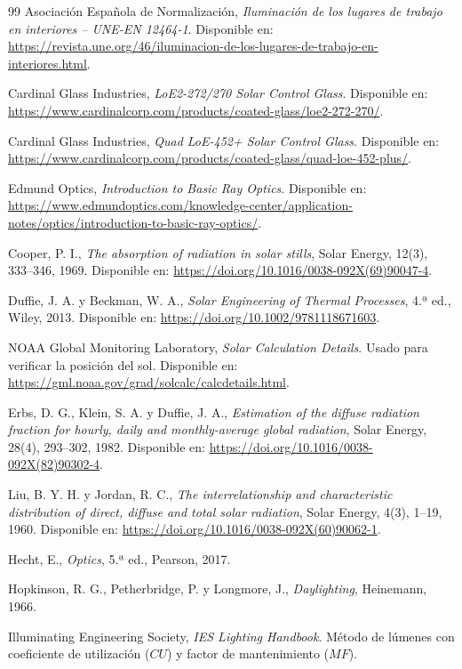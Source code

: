 \documentclass[12pt,a4paper]{article}
\begin{document}
\begin{thebibliography}{99}
Asociación Española de Normalización, \textit{Iluminación de los lugares de trabajo en interiores -- UNE-EN 12464-1}. Disponible en: \url{https://revista.une.org/46/iluminacion-de-los-lugares-de-trabajo-en-interiores.html}.

Cardinal Glass Industries, \textit{LoE2-272/270 Solar Control Glass}. Disponible en: \url{https://www.cardinalcorp.com/products/coated-glass/loe2-272-270/}.

Cardinal Glass Industries, \textit{Quad LoE-452+ Solar Control Glass}. Disponible en: \url{https://www.cardinalcorp.com/products/coated-glass/quad-loe-452-plus/}.

Edmund Optics, \textit{Introduction to Basic Ray Optics}. Disponible en: \url{https://www.edmundoptics.com/knowledge-center/application-notes/optics/introduction-to-basic-ray-optics/}.

Cooper, P. I., \textit{The absorption of radiation in solar stills}, Solar Energy, 12(3), 333--346, 1969. Disponible en: \url{https://doi.org/10.1016/0038-092X(69)90047-4}.

Duffie, J. A. y Beckman, W. A., \textit{Solar Engineering of Thermal Processes}, 4.ª ed., Wiley, 2013. Disponible en: \url{https://doi.org/10.1002/9781118671603}.

NOAA Global Monitoring Laboratory, \textit{Solar Calculation Details}. Usado para verificar la posición del sol. Disponible en: \url{https://gml.noaa.gov/grad/solcalc/calcdetails.html}.

Erbs, D. G., Klein, S. A. y Duffie, J. A., \textit{Estimation of the diffuse radiation fraction for hourly, daily and monthly-average global radiation}, Solar Energy, 28(4), 293--302, 1982. Disponible en: \url{https://doi.org/10.1016/0038-092X(82)90302-4}.

Liu, B. Y. H. y Jordan, R. C., \textit{The interrelationship and characteristic distribution of direct, diffuse and total solar radiation}, Solar Energy, 4(3), 1--19, 1960. Disponible en: \url{https://doi.org/10.1016/0038-092X(60)90062-1}.

Hecht, E., \textit{Optics}, 5.ª ed., Pearson, 2017.

Hopkinson, R. G., Petherbridge, P. y Longmore, J., \textit{Daylighting}, Heinemann, 1966.

Illuminating Engineering Society, \textit{IES Lighting Handbook}. Método de lúmenes con coeficiente de utilización ($CU$) y factor de mantenimiento ($MF$).

\end{thebibliography}
\end{document}
